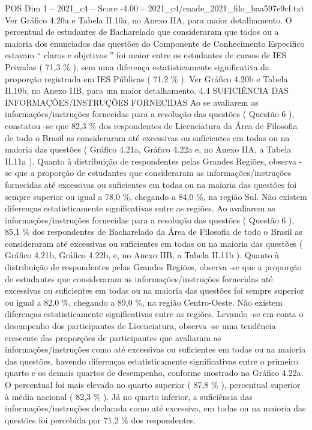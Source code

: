 \begin{textsample}{POS Dim 1 – 2021\_c4 – Score -4.00 – 2021\_c4/enade\_2021\_filo\_baa597e9cf.txt}
Ver Gráfico 4.20a e Tabela II.10a, no Anexo IIA, para maior detalhamento.
O percentual de estudantes de Bacharelado que consideraram que todos ou a maioria dos enunciados das questões do Componente de Conhecimento Específico estavam “ claros e objetivos ” foi maior entre os estudantes de cursos de IES Privadas ( 71,3 \% ), sem uma diferença estatisticamente significativa da proporção registrada em IES Públicas ( 71,2 \% ).
Ver Gráfico 4.20b e Tabela II.10b, no Anexo IIB, para um maior detalhamento. 4.4 SUFICIÊNCIA DAS INFORMAÇÕES/INSTRUÇÕES FORNECIDAS Ao se avaliarem as informações/instruções fornecidas para a resolução das questões ( Questão 6 ), constatou -se que 82,3 \% dos respondentes de Licenciatura da Área de Filosofia de todo o Brasil as consideraram até excessivas ou suficientes em todas ou na maioria das questões ( Gráfico 4.21a, Gráfico 4.22a e, no Anexo IIA, a Tabela II.11a ).
Quanto à distribuição de respondentes pelas Grandes Regiões, observa -se que a proporção de estudantes que consideraram as informações/instruções fornecidas até excessivas ou suficientes em todas ou na maioria das questões foi sempre superior ou igual a 78,0 \%, chegando a 84,0 \%, na região Sul.
Não existem diferenças estatisticamente significativas entre as regiões.
Ao avaliarem as informações/instruções fornecidas para a resolução das questões ( Questão 6 ), 85,1 \% dos respondentes de Bacharelado da Área de Filosofia de todo o Brasil as consideraram até excessivas ou suficientes em todas ou na maioria das questões ( Gráfico 4.21b, Gráfico 4.22b, e, no Anexo IIB, a Tabela II.11b ).
Quanto à distribuição de respondentes pelas Grandes Regiões, observa -se que a proporção de estudantes que consideraram as informações/instruções fornecidas até excessivas ou suficientes em todas ou na maioria das questões foi sempre superior ou igual a 82,0 \%, chegando a 89,0 \%, na região Centro-Oeste.
Não existem diferenças estatisticamente significativas entre as regiões.
Levando -se em conta o desempenho dos participantes de Licenciatura, observa -se uma tendência crescente das proporções de participantes que avaliaram as informações/instruções como até excessivas ou suficientes em todas ou na maioria das questões, havendo diferenças estatisticamente significativas entre o primeiro quarto e os demais quartos de desempenho, conforme mostrado no Gráfico 4.22a.
O percentual foi mais elevado no quarto superior ( 87,8 \% ), percentual superior à média nacional ( 82,3 \% ).
Já no quarto inferior, a suficiência das informações/instruções declarada como até excessiva, em todas ou na maioria das questões foi percebida por 71,2 \% dos respondentes.

\end{textsample}
